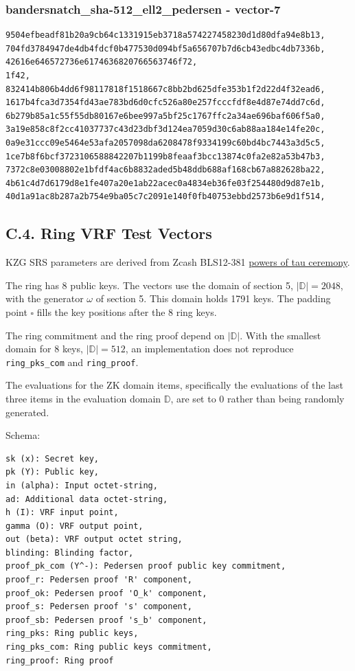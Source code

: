 \documentclass[
]{article}
\begin{document}
\subsubsection{bandersnatch\_sha-512\_ell2\_pedersen -
vector-7}\label{bandersnatch_sha-512_ell2_pedersen---vector-7}

\begin{verbatim}
9504efbeadf81b20a9cb64c1331915eb3718a574227458230d1d80dfa94e8b13,
704fd3784947de4db4fdcf0b477530d094bf5a656707b7d6cb43edbc4db7336b,
42616e646572736e6174636820766563746f72,
1f42,
832414b806b4dd6f98117818f1518667c8bb2bd625dfe353b1f2d22d4f32ead6,
1617b4fca3d7354fd43ae783bd6d0cfc526a80e257fcccfdf8e4d87e74dd7c6d,
6b279b85a1c55f55db80167e6bee997a5bf25c1767ffc2a34ae696baf606f5a0,
3a19e858c8f2cc41037737c43d23dbf3d124ea7059d30c6ab88aa184e14fe20c,
0a9e31ccc09e5464e53afa2057098da6208478f9334199c60bd4bc7443a3d5c5,
1ce7b8f6bcf3723106588842207b1199b8feaaf3bcc13874c0fa2e82a53b47b3,
7372c8e03008802e1bfdf4ac6b8832aded5b48ddb688af168cb67a882628ba22,
4b61c4d7d6179d8e1fe407a20e1ab22acec0a4834eb36fe03f254480d9d87e1b,
40d1a91ac8b287a2b754e9ba05c7c2091e140f0fb40753ebbd2573b6e9d1f514,
\end{verbatim}

\subsection{C.4. Ring VRF Test
Vectors}\label{c.4.-ring-vrf-test-vectors}

KZG SRS parameters are derived from Zcash BLS12-381
\href{https://zfnd.org/conclusion-of-the-powers-of-tau-ceremony}{powers
of tau ceremony}.

The ring has 8 public keys. The vectors use the domain of section 5,
\(|\mathbb{D}| = 2048\), with the generator \(\omega\) of section 5.
This domain holds 1791 keys. The padding point \(\square\) fills the key
positions after the 8 ring keys.

The ring commitment and the ring proof depend on \(|\mathbb{D}|\). With
the smallest domain for 8 keys, \(|\mathbb{D}| = 512\), an
implementation does not reproduce \texttt{ring\_pks\_com} and
\texttt{ring\_proof}.

The evaluations for the ZK domain items, specifically the evaluations of
the last three items in the evaluation domain \(\mathbb{D}\), are set to
0 rather than being randomly generated.

Schema:

\begin{verbatim}
sk (x): Secret key,
pk (Y): Public key,
in (alpha): Input octet-string,
ad: Additional data octet-string,
h (I): VRF input point,
gamma (O): VRF output point,
out (beta): VRF output octet string,
blinding: Blinding factor,
proof_pk_com (Y^-): Pedersen proof public key commitment,
proof_r: Pedersen proof 'R' component,
proof_ok: Pedersen proof 'O_k' component,
proof_s: Pedersen proof 's' component,
proof_sb: Pedersen proof 's_b' component,
ring_pks: Ring public keys,
ring_pks_com: Ring public keys commitment,
ring_proof: Ring proof
\end{verbatim}
\end{document}
